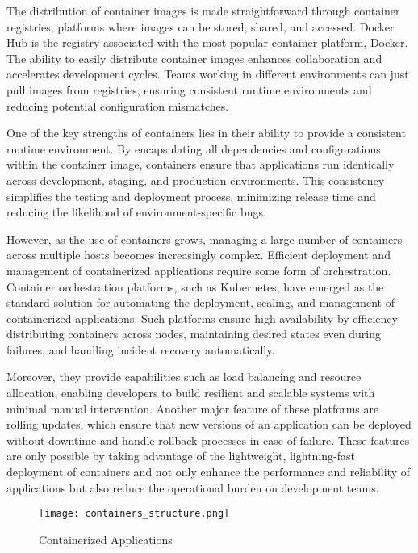 The distribution of container images is made straightforward through container registries, platforms where images can be stored, shared, and accessed. Docker Hub is the registry associated with the most popular container platform, Docker. The ability to easily distribute container images enhances collaboration and accelerates development cycles. Teams working in different environments can just pull images from registries, ensuring consistent runtime environments and reducing potential configuration mismatches.

One of the key strengths of containers lies in their ability to provide a consistent runtime environment. By encapsulating all dependencies and configurations within the container image, containers ensure that applications run identically across development, staging, and production environments. This consistency simplifies the testing and deployment process, minimizing release time and reducing the likelihood of environment-specific bugs.

However, as the use of containers grows, managing a large number of containers across multiple hosts becomes increasingly complex. Efficient deployment and management of containerized applications require some form of orchestration. Container orchestration platforms, such as Kubernetes, have emerged as the standard solution for automating the deployment, scaling, and management of containerized applications\cite{dockerDev}. Such platforms ensure high availability by efficiency distributing containers across nodes, maintaining desired states even during failures, and handling incident recovery automatically.

Moreover, they provide capabilities such as load balancing and resource allocation, enabling developers to build resilient and scalable systems with minimal manual intervention. Another major feature of these platforms are rolling updates, which ensure that new versions of an application can be deployed without downtime and handle rollback processes in case of failure. These features are only possible by taking advantage of the lightweight, lightning-fast deployment of containers and not only enhance the performance and reliability of applications but also reduce the operational burden on development teams.

\begin{figure}[!h]
    \graphicspath{ {./diagrams/} }
    \texttt{[image: containers\_structure.png]}
    \centering
    \caption{Containerized Applications}
    \label{fig:containerized_apps}
\end{figure}

